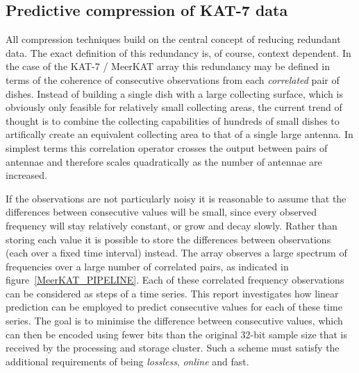\subsection{Predictive compression of KAT-7 data}
All compression techniques build on the central concept of reducing redundant data. The exact definition of this redundancy is, of course, context 
dependent. In the case of the KAT-7 / MeerKAT array this redundancy may be defined in terms of the coherence of consecutive observations from each 
\textit{correlated} pair of dishes. Instead of building a single dish with a large collecting surface, which is obviously only feasible for relatively small
collecting areas, the current trend of thought is to combine the collecting capabilities of hundreds of small dishes to artifically create an equivalent collecting
area to that of a single large antenna. In simplest terms this correlation operator crosses the output between pairs of antennae and therefore scales quadratically as the
number of antennae are increased. 

If the observations are not particularly noisy it is reasonable to assume that the differences between consecutive values will be small, since every observed frequency
will stay relatively constant, or grow and decay slowly. Rather than storing each value it is possible to store the differences between observations (each over a fixed time 
interval) instead. The array observes a large spectrum of frequencies over a large number of correlated pairs, as indicated in figure~\ref{MeerKAT_PIPELINE}. Each of these correlated frequency 
observations can be considered as steps of a time series. This report investigates how linear prediction can be employed to predict consecutive values for each of these time 
series. The goal is to minimise the difference between consecutive values, which can then be encoded using fewer bits than the original 32-bit sample size that is received 
by the processing and storage cluster. Such a scheme must satisfy the additional requirements of being \textit{lossless}, \textit{online} and fast.

